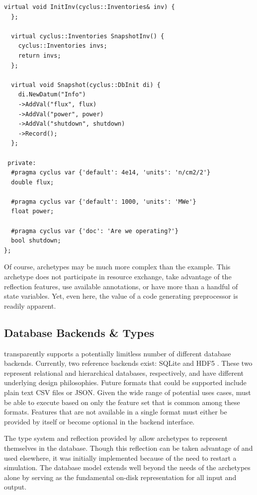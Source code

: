 \begin{lstlisting}[caption={Simple Reactor Archetype After Preprocessing with \cycpp, 
                            line marker directives have been removed for space}, 
                   label=rx-eg-cycpp]
  virtual void InitInv(cyclus::Inventories& inv) {
  };

  virtual cyclus::Inventories SnapshotInv() {
    cyclus::Inventories invs;
    return invs;
  };

  virtual void Snapshot(cyclus::DbInit di) {
    di.NewDatum("Info")
    ->AddVal("flux", flux)
    ->AddVal("power", power)
    ->AddVal("shutdown", shutdown)
    ->Record();
  };

 private:
  #pragma cyclus var {'default': 4e14, 'units': 'n/cm2/2'}
  double flux;

  #pragma cyclus var {'default': 1000, 'units': 'MWe'}
  float power;

  #pragma cyclus var {'doc': 'Are we operating?'}
  bool shutdown;
};
\end{lstlisting}

Of course, archetypes may be much more complex than the  example.
This archetype does not participate in resource exchange, take advantage of 
the reflection features, use available annotations, or have more than 
a handful of state variables.  Yet, even here, the value of a code generating
preprocessor is readily apparent.

\subsection{Database Backends \& Types}

\Cyclus transparently supports a potentially limitless number of different database 
backends. Currently, two reference backends exist: \gls{SQLite} \cite{owens2006definitive} 
and \gls{HDF5} \cite{folk2011overview}. These two represent relational and hierarchical 
databases, respectively, and have different underlying design philosophies.
Future formats that could be supported include plain text 
\gls{CSV} files or \gls{JSON}.  Given the wide range of potential uses cases, \cyclus must be able 
to execute based on only the feature set that is common among these formats.
Features that are not available in a single format must either be provided by \cyclus 
itself or become optional in the backend interface.

The type system and reflection provided by \cycpp 
allow archetypes to represent themselves in the database. Though this 
reflection can be taken advantage of and used elsewhere, it was initially
implemented because of the need to restart a simulation.
The database model extends well beyond the needs of the archetypes alone by 
serving as the fundamental on-disk representation for all \cyclus input and output.

